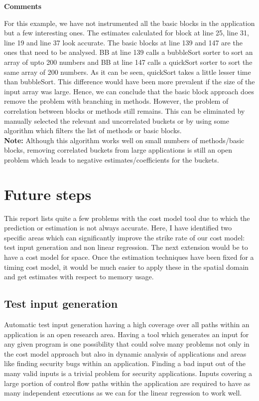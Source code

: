 \documentclass[11pt]{article}
\begin{document}
\textbf{Comments}

For this example, we have not instrumented all the basic blocks in the application but a few interesting ones. The estimates calculated for block at line 25, line 31, line 19 and line 37 look accurate. The basic blocks at line 139 and 147 are the ones that need to be analysed. BB at line 139 calls a bubbleSort sorter to sort an array of upto 200 numbers and BB at line 147 calls a quickSort sorter to sort the same array of 200 numbers. As it can be seen, quickSort takes a little lesser time than bubbleSort. This difference would have been more prevalent if the size of the input array was large. Hence, we can conclude that the basic block approach does remove the problem with branching in methods. However, the problem of correlation between blocks or methods still remains. This can be eliminated by manually selected the relevant and uncorrelated buckets or by using some algorithm which filters the list of methods or basic blocks. \\

\textbf{Note: }Although this algorithm works well on small numbers of methods/basic blocks, removing correlated buckets from large applications is still an open problem which leads to negative estimates/coefficients for the buckets.
\newpage

\section{Future steps}
This report lists quite a few problems with the cost model tool due to which the prediction or estimation is not always accurate. Here, I have identified two specific areas which can significantly improve the strike rate of our cost model: test input generation and non linear regression. The next extension would be to have a cost model for space. Once the estimation techniques have been fixed for a timing cost model, it would be much easier to apply these in the spatial domain and get estimates with respect to memory usage.

\subsection{Test input generation}
Automatic test input generation having a high coverage over all paths within an application is an open research area. Having a tool which generates an input for any given program is one possibility that could solve many problems not only in the cost model approach but also in dynamic analysis of applications and areas like finding security bugs within an application. Finding a bad input out of the many valid inputs is a trivial problem for security applications. Inputs covering a large portion of control flow paths within the application are required to have as many independent executions as we can for the linear regression to work well.
\end{document}

